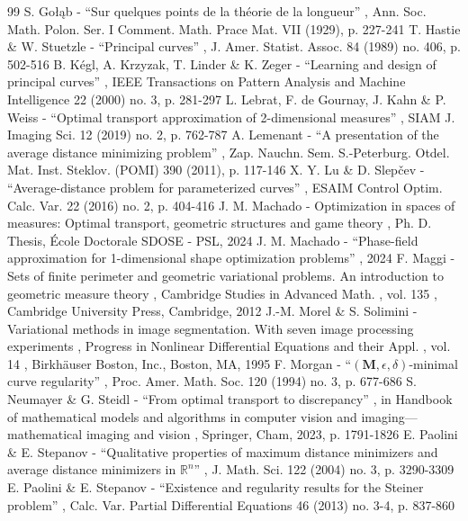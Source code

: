 \documentclass[11pt]{article}
\numberwithin{equation}{section}
\theoremstyle{definition}
\begin{document}
\begin{thebibliography}{99}
 S. Gołąb - “Sur quelques points de la théorie de la longueur” , Ann. Soc. Math. Polon. Ser. I Comment. Math. Prace Mat. VII (1929), p. 227-241
 T. Hastie \& W. Stuetzle - “Principal curves” , J. Amer. Statist. Assoc. 84 (1989) no. 406, p. 502-516
 B. Kégl, A. Krzyzak, T. Linder \& K. Zeger - “Learning and design of principal curves” , IEEE Transactions on Pattern Analysis and Machine Intelligence 22 (2000) no. 3, p. 281-297
 L. Lebrat, F. de Gournay, J. Kahn \& P. Weiss - “Optimal transport approximation of 2-dimensional measures” , SIAM J. Imaging Sci. 12 (2019) no. 2, p. 762-787
 A. Lemenant - “A presentation of the average distance minimizing problem” , Zap. Nauchn. Sem. S.-Peterburg. Otdel. Mat. Inst. Steklov. (POMI) 390 (2011), p. 117-146
 X. Y. Lu \& D. Slepčev - “Average-distance problem for parameterized curves” , ESAIM Control Optim. Calc. Var. 22 (2016) no. 2, p. 404-416
 J. M. Machado - Optimization in spaces of measures: Optimal transport, geometric structures and game theory , Ph. D. Thesis, École Doctorale SDOSE - PSL, 2024
 J. M. Machado - “Phase-field approximation for 1-dimensional shape optimization problems” , 2024
 F. Maggi - Sets of finite perimeter and geometric variational problems. An introduction to geometric measure theory , Cambridge Studies in Advanced Math. , vol. 135 , Cambridge University Press, Cambridge, 2012
 J.-M. Morel \& S. Solimini - Variational methods in image segmentation. With seven image processing experiments , Progress in Nonlinear Differential Equations and their Appl. , vol. 14 , Birkhäuser Boston, Inc., Boston, MA, 1995
 F. Morgan - “$({\mathbf{M}},\epsilon ,\delta )$-minimal curve regularity” , Proc. Amer. Math. Soc. 120 (1994) no. 3, p. 677-686
 S. Neumayer \& G. Steidl - “From optimal transport to discrepancy” , in Handbook of mathematical models and algorithms in computer vision and imaging—mathematical imaging and vision , Springer, Cham, 2023, p. 1791-1826
 E. Paolini \& E. Stepanov - “Qualitative properties of maximum distance minimizers and average distance minimizers in ${\mathbb{R}}^n$” , J. Math. Sci. 122 (2004) no. 3, p. 3290-3309
 E. Paolini \& E. Stepanov - “Existence and regularity results for the Steiner problem” , Calc. Var. Partial Differential Equations 46 (2013) no. 3-4, p. 837-860

\end{thebibliography}
\end{document}
